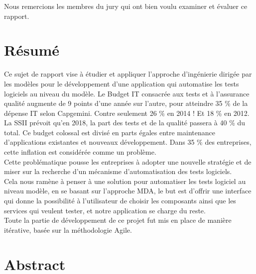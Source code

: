 \documentclass[
10pt, %
a4paper, %
oneside, %
headinclude,footinclude, %
BCOR5mm, %
]{scrartcl}
\begin{document}
Nous remercions les membres du jury qui ont bien voulu examiner et évaluer ce rapport.

\newpage
\section*{Résumé}

Ce sujet de rapport vise à étudier et appliquer l'approche d'ingénierie dirigée par les modèles pour le développement d’une application qui automatise les tests  logiciels au niveau du modèle.
Le Budget IT consacrée aux tests et à l’assurance qualité augmente de 9 points d’une année sur l’autre, pour atteindre 35 \% de la dépense IT selon Capgemini. Contre seulement 26 \% en 2014 ! Et 18 \% en 2012.\\

La SSII prévoit qu’en 2018, la part des tests et de la qualité passera à 40 \% du total. Ce budget colossal est divisé en parts égales entre maintenance d’applications existantes et nouveaux développement. Dans 35 \% des entreprises, cette inflation est considérée comme un problème.\\

Cette problématique pousse les entreprises à adopter une nouvelle stratégie et de miser sur la recherche d’un mécanisme d’automatisation des tests logiciels.\\

Cela nous ramène à penser à une solution pour automatiser les tests logiciel au niveau modèle, en se basant sur l’approche MDA, le but est d’offrir une interface qui donne la possibilité à l’utilisateur de choisir les composants ainsi que les services qui veulent tester, et notre application se charge du reste.\\

Toute la partie de développement de ce projet fut mis en place de manière itérative, basée sur la méthodologie Agile.

\section*{Abstract} %
\end{document}
